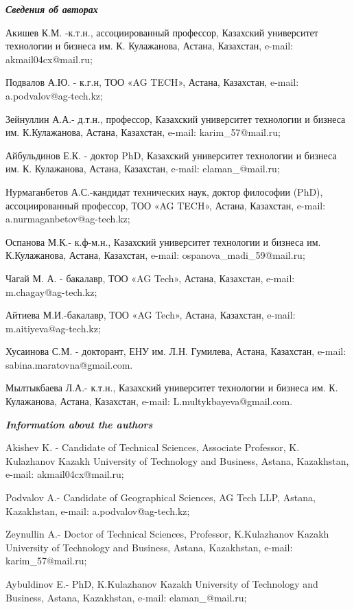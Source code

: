 \begin{info}
\hspace{1em}\emph{{\bfseries Сведения об авторах}}

Акишев К.М. -к.т.н., ассоциированный профессор, Казахский университет
технологии и бизнеса им. К. Кулажанова, Астана, Казахстан, e-mail:
akmail04cx@mail.ru;

Подвалов А.Ю. - к.г.н, ТОО «AG TECH», Астана, Казахстан, e-mail:
a.podvalov@ag-tech.kz;

Зейнуллин А.А.- д.т.н., профессор, Казахский университет технологии и
бизнеса им. К.Кулажанова, Астана, Казахстан, e-mail:
karim\_57@mail.ru;

Айбульдинов Е.К. - доктор PhD, Казахский университет технологии и
бизнеса им. К. Кулажанова, Астана, Казахстан, e-mail:
elaman\_@mail.ru;

Нурмаганбетов А.С.-кандидат технических наук, доктор философии (PhD),
ассоциированный профессор, ТОО «AG TECH», Астана, Казахстан, e-mail:
a.nurmaganbetov@ag-tech.kz;

Оспанова М.К.- к.ф-м.н., Казахский университет технологии и бизнеса
им.  К.Кулажанова, Астана, Казахстан, e-mail:
ospanova\_madi\_59@mail.ru;

Чагай М. А. - бакалавр, ТОО «AG Tech», Астана, Казахстан, e-mail:
m.chagay@ag-tech.kz;

Айтиева М.И.-бакалавр, ТОО «AG Tech», Астана, Казахстан, e-mail:
m.aitiyeva@ag-tech.kz;

Хусаинова С.М. - докторант, ЕНУ им. Л.Н. Гумилева, Астана, Казахстан,
e-mail: sabina.maratovna@gmail.com.

Мылтыкбаева Л.А.- к.т.н., Казахский университет технологии и бизнеса
им.  К. Кулажанова, Астана, Казахстан, e-mail:
L.multykbayeva@gmail.com.

\hspace{1em}\emph{{\bfseries Information about the authors}}

Akishev K. - Candidate of Technical Sciences, Associate Professor, K.
Kulazhanov Kazakh University of Technology and Business, Astana,
Kazakhstan, e-mail: akmail04cx@mail.ru;

Podvalov A.- Candidate of Geographical Sciences, AG Tech LLP, Astana,
Kazakhstan, e-mail: a.podvalov@ag-tech.kz;

Zeynullin A.- Doctor of Technical Sciences, Professor, K.Kulazhanov
Kazakh University of Technology and Business, Astana, Kazakhstan,
e-mail: karim\_57@mail.ru;

Aybuldinov E.- PhD, K.Kulazhanov Kazakh University of Technology and
Business, Astana, Kazakhstan, e-mail: elaman\_@mail.ru;


\end{info}
